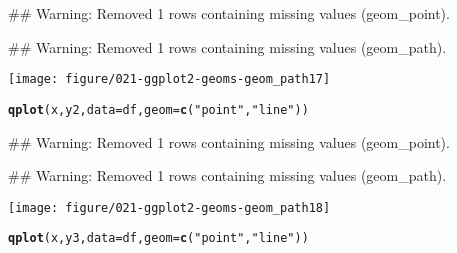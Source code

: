 \documentclass[a4paper,titlepage]{tufte-handout}\usepackage{graphicx, color}
\makeatletter
\def\maxwidth{ %
  \ifdim\Gin@nat@width>\linewidth
    \linewidth
  \else
    \Gin@nat@width
  \fi
}
\newcommand{\hlfunctioncall}[1]{\textcolor[rgb]{0.501960784313725,0,0.329411764705882}{\textbf{#1}}}%
\newcommand{\hlstring}[1]{\textcolor[rgb]{0.6,0.6,1}{#1}}%
\newenvironment{kframe}{%
 \def\at@end@of@kframe{}%
 \ifinner\ifhmode%
  \def\at@end@of@kframe{\end{minipage}}%
  \begin{minipage}{\columnwidth}%
 \fi\fi%
 \def\FrameCommand##1{\hskip\@totalleftmargin \hskip-\fboxsep
 \colorbox{shadecolor}{##1}\hskip-\fboxsep
     \hskip-\linewidth \hskip-\@totalleftmargin \hskip\columnwidth}%
 \MakeFramed {\advance\hsize-\width
   \@totalleftmargin\z@ \linewidth\hsize
   \@setminipage}}%
 {\par\unskip\endMakeFramed%
 \at@end@of@kframe}
\newenvironment{knitrout}{}{} %
\makeatother
\begin{document}
\begin{knitrout}
\begin{kframe}
{\ttfamily\noindent\textcolor{warningcolor}{\#\# Warning: Removed 1 rows containing missing values (geom\_point).}}

{\ttfamily\noindent\textcolor{warningcolor}{\#\# Warning: Removed 1 rows containing missing values (geom\_path).}}\end{kframe}\texttt{[image: figure/021-ggplot2-geoms-geom\_path17]} \begin{kframe}\begin{alltt}
\hlfunctioncall{qplot}(x, y2, data = df, geom = \hlfunctioncall{c}(\hlstring{"point"},\hlstring{"line"}))
\end{alltt}


{\ttfamily\noindent\textcolor{warningcolor}{\#\# Warning: Removed 1 rows containing missing values (geom\_point).}}

{\ttfamily\noindent\textcolor{warningcolor}{\#\# Warning: Removed 1 rows containing missing values (geom\_path).}}\end{kframe}\texttt{[image: figure/021-ggplot2-geoms-geom\_path18]} \begin{kframe}\begin{alltt}
\hlfunctioncall{qplot}(x, y3, data = df, geom = \hlfunctioncall{c}(\hlstring{"point"},\hlstring{"line"}))
\end{alltt}



\end{kframe}
\end{knitrout}
\end{document}
